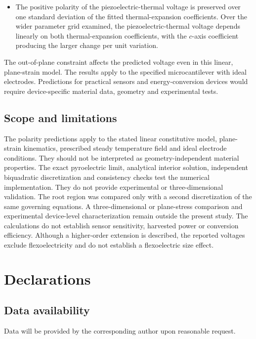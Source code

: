 \documentclass[a4paper,12pt]{elsarticle}
\begin{document}
\begin{itemize}
\item The positive polarity of the piezoelectric-thermal voltage is preserved over one
standard deviation of the fitted thermal-expansion coefficients. Over the wider parameter grid examined, the piezoelectric-thermal voltage depends
linearly on both thermal-expansion coefficients, with the $c$-axis coefficient
producing the larger change per unit variation.
\end{itemize}

The out-of-plane constraint affects the predicted voltage even in this
linear, plane-strain model. The results apply to the specified microcantilever with ideal electrodes.
Predictions for practical sensors and energy-conversion devices would require
device-specific material data, geometry and experimental tests.


\subsection*{Scope and limitations}
The polarity predictions apply to the stated linear constitutive model,
plane-strain kinematics, prescribed steady temperature field and ideal electrode
conditions. They should not be interpreted as geometry-independent material
properties. The exact pyroelectric limit, analytical interior solution, independent
biquadratic discretization and consistency checks test the numerical
implementation. They do not provide experimental or three-dimensional
validation. The root region was compared only with a second discretization
of the same governing equations. A three-dimensional or plane-stress comparison and
experimental device-level characterization remain outside the present study.
The calculations do not establish sensor sensitivity, harvested power or conversion
efficiency. Although a higher-order extension is described, the reported voltages
exclude flexoelectricity and do not establish a flexoelectric size effect.


\section*{Declarations}
\subsection*{Data availability}
Data will be provided by the corresponding author upon reasonable request.




\end{document}

